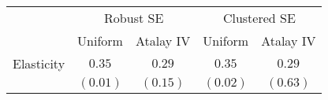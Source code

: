 
\begin{tabular}{l c c c c}
\hline
 & \multicolumn{2}{c}{Robust SE} & \multicolumn{2}{c}{Clustered SE} \\
\cline{2-3} \cline{4-5}
 & Uniform & Atalay IV & Uniform & Atalay IV \\
\hline
Elasticity & $0.35$   & $0.29$   & $0.35$   & $0.29$   \\
           & $(0.01)$ & $(0.15)$ & $(0.02)$ & $(0.63)$ \\
\hline
\end{tabular}
